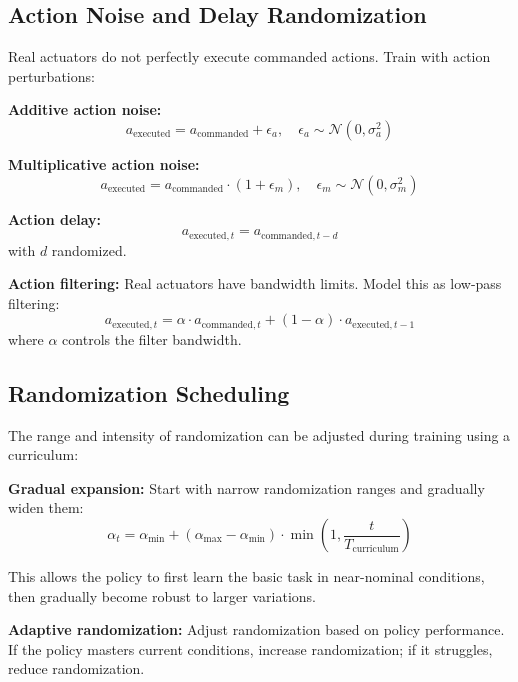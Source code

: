 \subsection{Action Noise and Delay Randomization}

Real actuators do not perfectly execute commanded actions. Train with action perturbations:

\textbf{Additive action noise:}
\begin{equation}
a_{\text{executed}} = a_{\text{commanded}} + \epsilon_a, \quad \epsilon_a \sim \mathcal{N}(0, \sigma_a^2)
\end{equation}

\textbf{Multiplicative action noise:}
\begin{equation}
a_{\text{executed}} = a_{\text{commanded}} \cdot (1 + \epsilon_m), \quad \epsilon_m \sim \mathcal{N}(0, \sigma_m^2)
\end{equation}

\textbf{Action delay:}
\begin{equation}
a_{\text{executed},t} = a_{\text{commanded},t-d}
\end{equation}
with $d$ randomized.

\textbf{Action filtering:}
Real actuators have bandwidth limits. Model this as low-pass filtering:
\begin{equation}
a_{\text{executed},t} = \alpha \cdot a_{\text{commanded},t} + (1-\alpha) \cdot a_{\text{executed},t-1}
\end{equation}
where $\alpha$ controls the filter bandwidth.

\subsection{Randomization Scheduling}

The range and intensity of randomization can be adjusted during training using a curriculum:

\textbf{Gradual expansion:} Start with narrow randomization ranges and gradually widen them:
\begin{equation}
\alpha_t = \alpha_{\min} + (\alpha_{\max} - \alpha_{\min}) \cdot \min\left(1, \frac{t}{T_{\text{curriculum}}}\right)
\end{equation}

This allows the policy to first learn the basic task in near-nominal conditions, then gradually become robust to larger variations.

\textbf{Adaptive randomization:} Adjust randomization based on policy performance. If the policy masters current conditions, increase randomization; if it struggles, reduce randomization.


